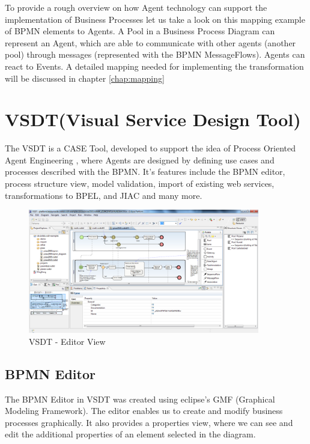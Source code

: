 To provide a rough overview on how Agent technology can support the implementation of Business Processes let us take a look on this mapping example of BPMN elements to Agents. A Pool in a Business Process Diagram can represent an Agent, which are able to communicate with other agents (another pool) through messages (represented with the BPMN MessageFlows). Agents can react to Events. A detailed mapping needed for implementing the transformation will be discussed in chapter \ref{chap:mapping}

\newpage
\section{VSDT(Visual Service Design Tool)}
\label{sec:vsdt}
The VSDT is a CASE Tool, developed to support the idea of Process Oriented Agent Engineering \cite{TKMLAH2010}, where Agents are designed by defining use cases and processes described with the BPMN. It's features include the BPMN editor, process structure view, model validation, import of existing web services, transformations to BPEL, and JIAC and many more. 
\begin{figure}[h]
	\centering
		\includegraphics[width=0.90\textwidth]{images/vsdt_snapshot.png}
	\caption{VSDT - Editor View}
	\label{fig:VSDT}
\end{figure}

\subsection{BPMN Editor}
The BPMN Editor in VSDT was created using eclipse's GMF (Graphical Modeling Framework). The editor enables us to create and modify business processes graphically. It also provides a properties view, where we can see and edit the additional properties of an element selected in the diagram. 

